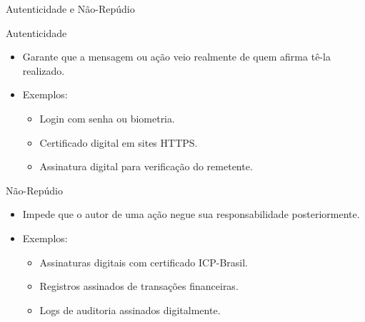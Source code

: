 \begin{frame}{Autenticidade e Não-Repúdio}
    \begin{block}{Autenticidade}
        \begin{itemize}
            \item Garante que a mensagem ou ação veio realmente de quem afirma tê-la realizado.
            \item Exemplos:
                  \begin{itemize}
                      \item Login com senha ou biometria.
                      \item Certificado digital em sites HTTPS.
                      \item Assinatura digital para verificação do remetente.
                  \end{itemize}
        \end{itemize}
    \end{block}

    \begin{block}{Não-Repúdio}
        \begin{itemize}
            \item Impede que o autor de uma ação negue sua responsabilidade posteriormente.
            \item Exemplos:
                  \begin{itemize}
                      \item Assinaturas digitais com certificado ICP-Brasil.
                      \item Registros assinados de transações financeiras.
                      \item Logs de auditoria assinados digitalmente.
                  \end{itemize}
        \end{itemize}
    \end{block}
\end{frame}


